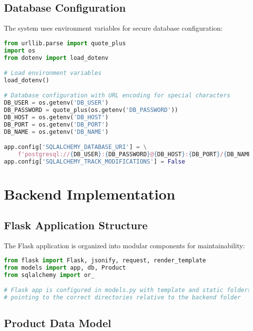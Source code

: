 \documentclass[12pt,a4paper]{article}
\begin{document}
\subsection{Database Configuration}

The system uses environment variables for secure database configuration:

\begin{lstlisting}[language=Python, caption=Database Configuration (models.py)]
from urllib.parse import quote_plus
import os
from dotenv import load_dotenv

# Load environment variables
load_dotenv()

# Database configuration with URL encoding for special characters
DB_USER = os.getenv('DB_USER')
DB_PASSWORD = quote_plus(os.getenv('DB_PASSWORD'))
DB_HOST = os.getenv('DB_HOST')
DB_PORT = os.getenv('DB_PORT')
DB_NAME = os.getenv('DB_NAME')

app.config['SQLALCHEMY_DATABASE_URI'] = \
    f'postgresql://{DB_USER}:{DB_PASSWORD}@{DB_HOST}:{DB_PORT}/{DB_NAME}'
app.config['SQLALCHEMY_TRACK_MODIFICATIONS'] = False
\end{lstlisting}

\section{Backend Implementation}

\subsection{Flask Application Structure}

The Flask application is organized into modular components for maintainability:

\begin{lstlisting}[language=Python, caption=Main Application (app.py) - Core Imports and Setup]
from flask import Flask, jsonify, request, render_template
from models import app, db, Product
from sqlalchemy import or_

# Flask app is configured in models.py with template and static folders
# pointing to the correct directories relative to the backend folder
\end{lstlisting}

\subsection{Product Data Model}
\end{document}
